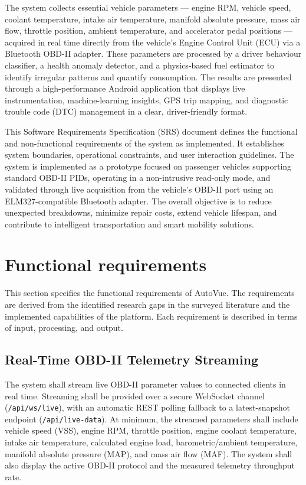 \documentclass[10pt,a4paper]{report}
\begin{document}
The system collects essential vehicle parameters — engine RPM, vehicle speed, coolant temperature, intake air temperature, manifold absolute pressure, mass air flow, throttle position, ambient temperature, and accelerator pedal positions — acquired in real time directly from the vehicle's Engine Control Unit (ECU) via a Bluetooth OBD-II adapter. These parameters are processed by a driver behaviour classifier, a health anomaly detector, and a physics-based fuel estimator to identify irregular patterns and quantify consumption. The results are presented through a high-performance Android application that displays live instrumentation, machine-learning insights, GPS trip mapping, and diagnostic trouble code (DTC) management in a clear, driver-friendly format. \par

This Software Requirements Specification (SRS) document defines the functional and non-functional requirements of the system as implemented. It establishes system boundaries, operational constraints, and user interaction guidelines. The system is implemented as a prototype focused on passenger vehicles supporting standard OBD-II PIDs, operating in a non-intrusive read-only mode, and validated through live acquisition from the vehicle's OBD-II port using an ELM327-compatible Bluetooth adapter. The overall objective is to reduce unexpected breakdowns, minimize repair costs, extend vehicle lifespan, and contribute to intelligent transportation and smart mobility solutions.

\section{Functional requirements}
This section specifies the functional requirements of AutoVue. The requirements are derived from the identified research gaps in the surveyed literature and the implemented capabilities of the platform. Each requirement is described in terms of input, processing, and output.

\subsection{Real-Time OBD-II Telemetry Streaming}
The system shall stream live OBD-II parameter values to connected clients in real time. Streaming shall be provided over a secure WebSocket channel (\texttt{/api/ws/live}), with an automatic REST polling fallback to a latest-snapshot endpoint (\texttt{/api/live-data}). At minimum, the streamed parameters shall include vehicle speed (VSS), engine RPM, throttle position, engine coolant temperature, intake air temperature, calculated engine load, barometric/ambient temperature, manifold absolute pressure (MAP), and mass air flow (MAF). The system shall also display the active OBD-II protocol and the measured telemetry throughput rate. \par
\end{document}
